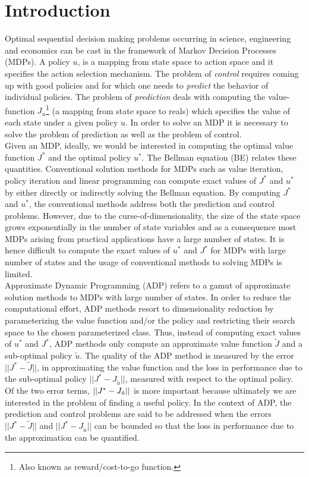 \documentclass[12pt,draftcls,onecolumn]{IEEEtran}
\begin{document}
\section{Introduction}\label{intro}
Optimal sequential decision making problems occurring in science, engineering and economics can be cast in the framework of Markov Decision Processes (MDPs). A policy $u$, is a mapping from state space to action space and it specifies the action selection mechanism. The problem of \emph{control} requires coming up with good policies and for which one needs to \emph{predict} the behavior of individual policies. The problem of \emph{prediction} deals with computing the value-function $J_u$\footnote{Also known as reward/cost-to-go function.} (a mapping from state space to reals) which specifies the value of each state under a given policy $u$. In order to solve an MDP it is necessary to solve the problem of prediction as well as the problem of control.\\
Given an MDP, ideally, we would be interested in computing the optimal value function $J^*$ and the optimal policy $u^*$. The Bellman equation (BE) relates these quantities. Conventional solution methods for MDPs \cite{BertB} such as value iteration, policy iteration and linear programming can compute exact values of $J^*$ and $u^*$ by either directly or indirectly solving the Bellman equation. By computing $J^*$ and $u^*$, the conventional methods address both the prediction and control problems. However, due to the curse-of-dimensionality, the size of the state space grows exponentially in the number of state variables and as a consequence most MDPs arising from practical applications have a large number of states. It is hence difficult to compute the exact values of $u^*$ and $J^*$ for MDPs with large number of states and the usage of conventional methods to solving MDPs is limited.\\
Approximate Dynamic Programming (ADP) \cite{dpchapter,powell} refers to a gamut of approximate solution methods to MDPs with large number of states. In order to reduce the computational effort, ADP methods resort to dimensionality reduction by parameterizing the value function and/or the policy and restricting their search space to the chosen parameterized class. Thus, instead of computing exact values of $u^*$ and $J^*$, ADP methods only compute an approximate value function $\tilde{J}$ and a sub-optimal policy $\tilde{u}$. The quality of the ADP method is measured by the error $||J^*-\tilde{J}||$, in approximating the value function and the loss in performance due to the sub-optimal policy $||J^*-J_{\tilde{u}}||$, measured with respect to the optimal policy. Of the two error terms, $||J^*-J_{\tilde{u}}||$ is more important because ultimately we are interested in the problem of finding a useful policy. In the context of ADP, the prediction and control problems are said to be addressed when the errors $||J^*-\tilde{J}||$ and $||J^*-J_{\tilde{u}}||$ can be bounded so that the loss in performance due to the approximation can be quantified.\\
\end{document}
